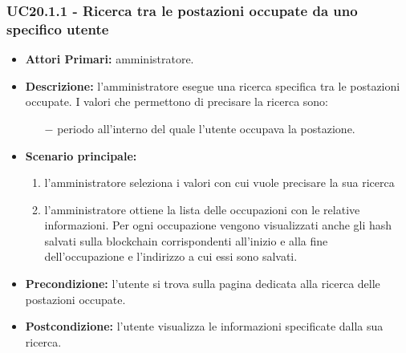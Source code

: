 \subsubsection{ UC20.1.1 - Ricerca tra le postazioni occupate da uno specifico utente}
\begin{itemize}
	\item\textbf{Attori Primari:} 
	amministratore.
	\item\textbf{Descrizione:} 
	l'amministratore esegue una ricerca specifica tra le postazioni occupate.
	I valori che permettono di precisare la ricerca sono:
	\begin{itemize}
		\item[$-$] periodo all'interno del quale l'utente occupava la postazione.
	\end{itemize}
	\item\textbf{Scenario principale:} 
	\begin{enumerate}
		\item l'amministratore seleziona i valori con cui vuole precisare la sua ricerca
		\item l'amministratore ottiene la lista delle occupazioni con le relative informazioni. Per ogni occupazione vengono visualizzati anche gli hash salvati sulla blockchain corrispondenti all'inizio e alla fine dell'occupazione e l'indirizzo a cui essi sono salvati.
	\end{enumerate}
	\item\textbf{Precondizione:} 
	l'utente si trova sulla pagina dedicata alla ricerca delle postazioni occupate.
	\item\textbf{Postcondizione:}
	l'utente visualizza le informazioni specificate dalla sua ricerca.
\end{itemize}

